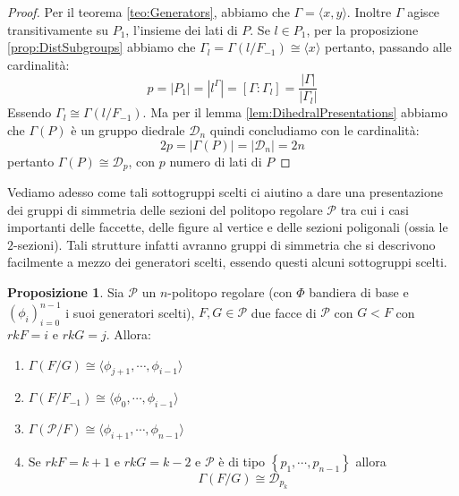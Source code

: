 \documentclass[a4paper,12pt]{report}
\newcommand{\p}{\mathcal{P}}
\theoremstyle{plain}
\theoremstyle{definition}
\newtheorem{prop}[teo]{Proposizione}
\newcommand\locallabel[1]{\label{\currentprefix_#1}}
\begin{document}
\begin{proof}
Per il teorema \ref{teo:Generators}, abbiamo che $\Gamma=\langle x,y\rangle$. Inoltre $\Gamma$ agisce transitivamente su $P_1$, l'insieme dei
lati di $P$. Se $l\in P_1$, per la proposizione \ref{prop:DistSubgroups} abbiamo che $\Gamma_l=\Gamma(l/F_{-1})\cong\langle x\rangle$
pertanto, passando alle cardinalit\`a:
\begin{equation*}
p=\left|P_1\right|=\left|l^\Gamma\right|=\left[\Gamma:\Gamma_l\right]=\frac{\left|\Gamma\right|}{\left|\Gamma_l\right|}
\end{equation*}
Essendo $\Gamma_l\cong\Gamma(l/F_{-1})$. Ma per il lemma \ref{lem:DihedralPresentations} abbiamo che $\Gamma(P)$ \`e un gruppo diedrale $\mathcal{D}_n$
quindi concludiamo con le cardinalit\`a:
\begin{equation*}
2p=\left|\Gamma(P)\right|=\left|\mathcal{D}_n\right|=2n
\end{equation*}
pertanto $\Gamma(P)\cong\mathcal{D}_p$, con $p$ numero di lati di $P$
\end{proof}
Vediamo adesso come tali sottogruppi scelti ci aiutino a dare una presentazione dei gruppi di simmetria delle sezioni del politopo regolare $\p$ tra
cui i casi importanti delle faccette, delle figure al vertice e delle sezioni poligonali (ossia le $2$-sezioni). Tali strutture infatti avranno gruppi
di simmetria che si descrivono facilmente a mezzo dei generatori scelti, essendo questi alcuni sottogruppi scelti.
\def\currentprefix{prop:SelectedSubgroupsSections}
\begin{prop}
\label{prop:SelectedSubgroupsSections}
Sia $\p$ un $n$-politopo regolare (con $\Phi$ bandiera di base e $(\phi_i)_{i=0}^{n-1}$ i suoi generatori scelti),
$F,G\in\p$ due facce di $\p$ con $G<F$ con $rkF=i$ e $rkG=j$. Allora:
\begin{enumerate}
\item\locallabel{1}$\Gamma(F/G)\cong\langle \phi_{j+1},\cdots,\phi_{i-1}\rangle$
\item\locallabel{2}$\Gamma(F/F_{-1})\cong\langle \phi_0,\cdots,\phi_{i-1}\rangle$
\item\locallabel{3}$\Gamma(\p/F)\cong\langle\phi_{i+1},\cdots,\phi_{n-1}\rangle$
\item\locallabel{4}Se $rkF=k+1$ e $rkG=k-2$ e $\p$ \`e di tipo $\left\{p_1,\cdots,p_{n-1}\right\}$ allora
\begin{equation}
\Gamma(F/G)\cong\mathcal{D}_{p_k}
\end{equation}
\end{enumerate}
\end{prop}
\end{document}
